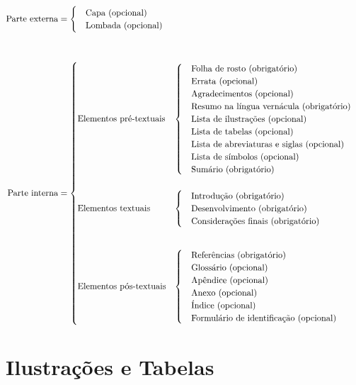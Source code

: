 \documentclass{Arquivos/TrabalhoAcademico}
\begin{document}
{\SingleSpacing
\[
\begin{aligned}
\text{Parte externa} &=
\begin{cases}
\quad\text{Capa (opcional)}\\
\quad\text{Lombada (opcional)}
\end{cases}
\\[3em]
\text{Parte interna} &=
\begin{cases}
\text{Elementos pré-textuais} &
\begin{cases}
\quad\text{Folha de rosto (obrigatório)}\\
\quad\text{Errata (opcional)}\\
\quad\text{Agradecimentos (opcional)}\\
\quad\text{Resumo na língua vernácula (obrigatório)}\\
\quad\text{Lista de ilustrações (opcional)}\\
\quad\text{Lista de tabelas (opcional)}\\
\quad\text{Lista de abreviaturas e siglas (opcional)}\\
\quad\text{Lista de símbolos (opcional)}\\
\quad\text{Sumário (obrigatório)}
\end{cases}
\\\rule{0pt}{4em}
\text{Elementos textuais} &
\begin{cases}
\quad\text{Introdução (obrigatório)}\\
\quad\text{Desenvolvimento (obrigatório)}\\
\quad\text{Considerações finais (obrigatório)}
\end{cases}
\\\rule{0pt}{7em}
\text{Elementos pós-textuais} &
\begin{cases}
\quad\text{Referências (obrigatório)}\\
\quad\text{Glossário (opcional)}\\
\quad\text{Apêndice (opcional)}\\
\quad\text{Anexo (opcional)}\\
\quad\text{Índice (opcional)}\\
\quad\text{Formulário de identificação (opcional)}
\end{cases}
\end{cases}
\end{aligned}
\]}





\section{Ilustrações e Tabelas}
\end{document}
